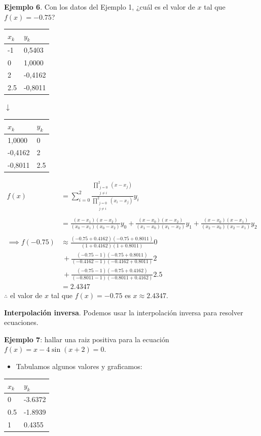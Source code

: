 \documentclass[]{book}
\providecommand{\tightlist}{%
  \setlength{\itemsep}{0pt}\setlength{\parskip}{0pt}}
\begin{document}
\textbf{Ejemplo 6}. Con los datos del Ejemplo 1, ¿cuál es el valor de \(x\) tal que \(f(x)=-0.75\)?

\begin{longtable}[]{@{}ll@{}}
\toprule
\(x_k\) & \(y_k\)\tabularnewline
\midrule
\endhead
-1 & 0,5403\tabularnewline
0 & 1,0000\tabularnewline
2 & -0,4162\tabularnewline
2.5 & -0,8011\tabularnewline
\bottomrule
\end{longtable}

\(\downarrow\)

\begin{longtable}[]{@{}ll@{}}
\toprule
\(x_k\) & \(y_k\)\tabularnewline
\midrule
\endhead
1,0000 & 0\tabularnewline
-0,4162 & 2\tabularnewline
-0,8011 & 2.5\tabularnewline
\bottomrule
\end{longtable}

\[
\begin{split}
f(x) &= \sum_{i = 0}^2 \frac{\prod\limits_{\substack{j = 0\\ j \neq i}}^2 (x - x_j)}{\prod\limits_{\substack{j = 0\\ j \neq i}}^2 (x_i - x_j)} y_i \\ \\
&= \frac{(x - x_1)(x - x_2)}{(x_0 - x_1)(x_0 - x_2)} y_0 + \frac{(x - x_0)(x - x_2)}{(x_1 - x_0)(x_1 - x_2)} y_1 + \frac{(x - x_0)(x - x_1)}{(x_2 - x_0)(x_2 - x_1)} y_2 \\ \\
\implies f(-0.75) &\approx \frac{(-0.75+0.4162)(-0.75+0.8011)}{(1+0.4162)(1+0.8011)} 0 \\
&~ + \frac{(-0.75-1)(-0.75+0.8011)}{(-0.4162-1)(-0.4162+0.8011)} 2 \\
&~ + \frac{(-0.75-1)(-0.75+0.4162)}{(-0.8011-1)(-0.8011+0.4162)} 2.5  \\
&= 2.4347
\end{split}
\]
\(\therefore\) el valor de \(x\) tal que \(f(x)=-0.75\) es \(x \approx 2.4347\).

\textbf{Interpolación inversa}. Podemos usar la interpolación inversa para resolver ecuaciones.

\textbf{Ejemplo 7}: hallar una raiz positiva para la ecuación \(f(x)=x-4\sin(x+2) = 0\).

\begin{itemize}
\tightlist
\item
  Tabulamos algunos valores y graficamos:
\end{itemize}

\begin{longtable}[]{@{}ll@{}}
\toprule
\(x_k\) & \(y_k\)\tabularnewline
\midrule
\endhead
0 & -3.6372\tabularnewline
0.5 & -1.8939\tabularnewline
1 & 0.4355\tabularnewline
\bottomrule
\end{longtable}
\end{document}
